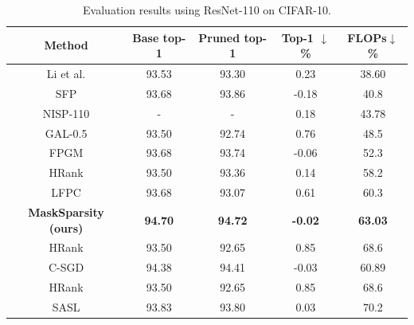 \documentclass[review]{cvpr}
\begin{document}
\begin{table}[ht]
	\caption{Evaluation results using ResNet-110 on CIFAR-10.}
	\vspace{-0.4cm}
	\small
	\setlength{\tabcolsep}{0.01em}
	\begin{center}
		\begin{tabular}{ccccc}
			\hline
			
			Method 							&Base top-1		&Pruned top-1	& Top-1 $\downarrow$\% 	&FLOPs$\downarrow$\%	 			\\
			\hline
			
			
			Li et al. \cite{li2016pruning}		    &	93.53	&	93.30	&	0.23 		&	38.60	    \\
			SFP \cite{he2018soft}					&	93.68	&	93.86	&	-0.18	    &	40.8	    \\
			NISP-110 \cite{yu2018nisp}				&	-		&	-		&	0.18		&	43.78		\\
			GAL-0.5 \cite{GAL}						&	93.50	&	92.74	&	0.76		&	48.5		\\
			
			FPGM \cite{FPGM}		&93.68	&93.74	&	-0.06	&	52.3\\

			
			
			HRank \cite{HRank}						&	93.50	&	93.36	&	0.14		&	58.2		\\
			
			LFPC \cite{he2020learning}				&	93.68	&	93.07	&	0.61	    &	60.3	    \\
			\textbf{MaskSparsity (ours)}	&	\textbf{94.70}	&	\textbf{94.72}	&	\textbf{-0.02}	&	\textbf{63.03}\\
			HRank \cite{HRank}		&	93.50	&	92.65	&      0.85		&	68.6		\\
		
		
		   	C-SGD \cite{CSGD}						&	94.38	&	94.41	&	-0.03		&	60.89		\\
		    HRank									&	93.50	&	92.65	&	0.85		&	68.6		\\
		    
		    SASL \cite{SASL}						&	93.83	&	93.80	&	0.03		&	70.2		\\
		 
			
			\hline
			
		\end{tabular}
	\end{center}
	\label{exp-table-cifar10-r110}
\end{table}
 
\end{document}
